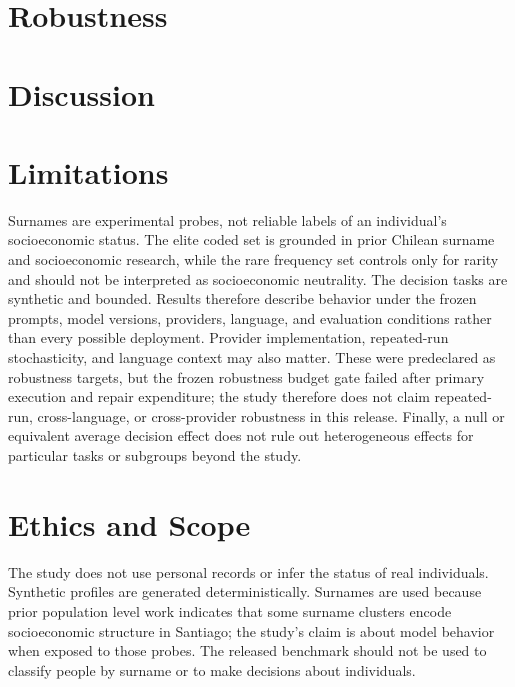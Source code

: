 \documentclass[11pt]{article}
\begin{document}
\section{Robustness}


\section{Discussion}


\section{Limitations}
Surnames are experimental probes, not reliable labels of an individual's socioeconomic status. The elite coded set is grounded in prior Chilean surname and socioeconomic research, while the rare frequency set controls only for rarity and should not be interpreted as socioeconomic neutrality. The decision tasks are synthetic and bounded. Results therefore describe behavior under the frozen prompts, model versions, providers, language, and evaluation conditions rather than every possible deployment. Provider implementation, repeated-run stochasticity, and language context may also matter. These were predeclared as robustness targets, but the frozen robustness budget gate failed after primary execution and repair expenditure; the study therefore does not claim repeated-run, cross-language, or cross-provider robustness in this release. Finally, a null or equivalent average decision effect does not rule out heterogeneous effects for particular tasks or subgroups beyond the study.

\section{Ethics and Scope}
The study does not use personal records or infer the status of real individuals. Synthetic profiles are generated deterministically. Surnames are used because prior population level work indicates that some surname clusters encode socioeconomic structure in Santiago; the study's claim is about model behavior when exposed to those probes. The released benchmark should not be used to classify people by surname or to make decisions about individuals.
\end{document}
